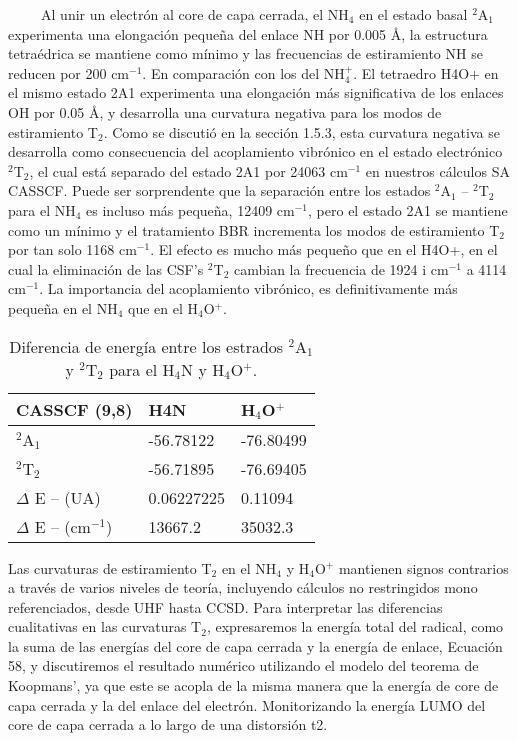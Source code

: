 \documentclass[12pt]{report}
\begin{document}
\newpage
\textcolor{white}{Hola}
\newpage
Al unir un electrón al core de capa cerrada, el NH$_4$ en el estado basal $^2$A$_1$ experimenta una elongación pequeña del enlace NH por 0.005 \AA, la estructura tetraédrica se mantiene como mínimo y las frecuencias de estiramiento NH se reducen por 200 cm$^{-1}$. En comparación con los del NH$_4^+$. El tetraedro H4O+ en el mismo estado 2A1 experimenta una elongación más significativa de los enlaces OH por 0.05 \AA, y desarrolla una curvatura negativa para los modos de estiramiento T$_2$. Como se discutió en la sección 1.5.3, esta curvatura negativa se desarrolla como consecuencia del acoplamiento vibrónico en el estado electrónico $^2$T$_2$, el cual está separado del estado 2A1 por 24063 cm$^{-1}$ en nuestros cálculos SA CASSCF. Puede ser sorprendente que la separación entre los estados $^2$A$_1$ – $^2$T$_2$ para el NH$_4$ es incluso más pequeña, 12409 cm$^{-1}$, pero el estado 2A1 se mantiene como un mínimo y el tratamiento BBR incrementa los modos de estiramiento T$_2$ por tan solo 1168 cm$^{-1}$. El efecto es mucho más pequeño que en el H4O+, en el cual la eliminación de las CSF’s  $^2$T$_2$ cambian la frecuencia de 1924 i cm$^{-1}$ a 4114 cm$^{-1}$. La importancia del acoplamiento vibrónico, es definitivamente más pequeña en el NH$_4$ que en el H$_4$O$^+$.

\begin{table}[h]
\centering
\begin{tabular}{l|l|l}
\hline
CASSCF (9,8) & H4N  & H$_4$O$^+$  \\ \hline
$^2$A$_1$ & -56.78122 & -76.80499 \\
$^2$T$_2$ & -56.71895 & -76.69405 \\
$\Delta$ E – (UA)  & 0.06227225 & 0.11094 \\
$\Delta$ E – (cm$^{-1}$) &13667.2  & 35032.3\\ \hline
\end{tabular}
\caption{Diferencia de energía entre los estrados $^2$A$_1$ y $^2$T$_2$ para el H$_4$N y H$_4$O$^+$.}
\end{table}

\newpage

Las curvaturas de estiramiento T$_2$ en el NH$_4$ y H$_4$O$^+$ mantienen signos contrarios a través de varios niveles de teoría, incluyendo cálculos no restringidos mono referenciados, desde UHF hasta CCSD. Para interpretar las diferencias cualitativas en las curvaturas T$_2$, expresaremos la energía total del radical, como la suma de las energías del core de capa cerrada y la energía de enlace, Ecuación 58, y discutiremos el resultado numérico utilizando el modelo del teorema de Koopmans’, ya que este se acopla de la misma manera que la energía de core de capa cerrada y la del enlace del electrón. Monitorizando la energía LUMO del core de capa cerrada a lo largo de una distorsión t2.
\\
\end{document}
